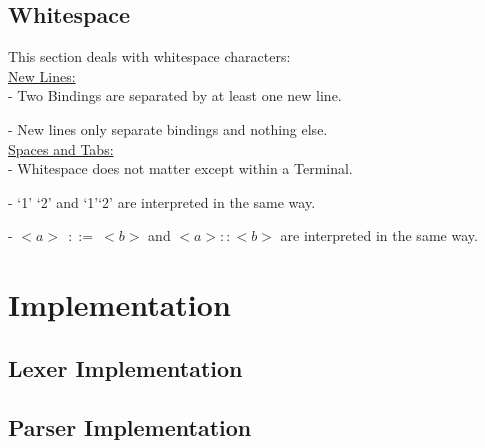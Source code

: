\documentclass{scrreprt}
\begin{document}
\section{Whitespace}

This section deals with whitespace characters:\\

\underline{New Lines:}\\

- Two Bindings are separated by at least one new line.

- New lines only separate bindings and nothing else.\\

\underline{Spaces and Tabs:}\\

- Whitespace does not matter except within a Terminal.

- `1' `2' and `1'`2' are interpreted in the same way.

- $<a>\ \ ::= \ <b>$ and $<a>::<b>$ are interpreted in the same way.


\chapter{Implementation}

\section{Lexer Implementation}

\section{Parser Implementation}
\end{document}
